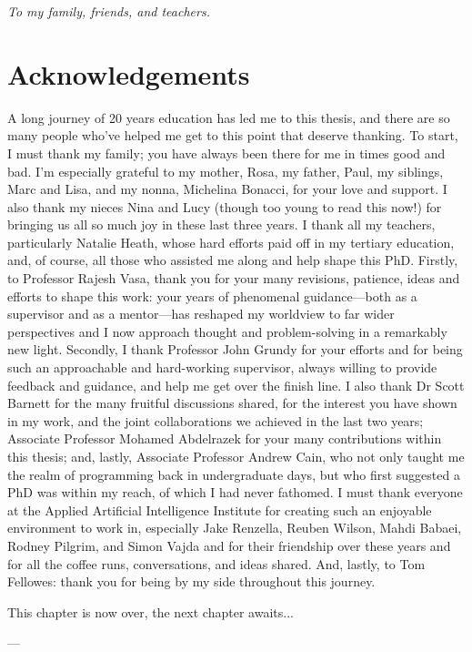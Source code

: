 \cleardoublepage
\pagestyle{empty}
\begin{center}
  \vspace*{0.3\paperheight}
  \textit{To my family, friends, and teachers.}
\end{center}
\pagestyle{fancy}

\chapter*{Acknowledgements}

\vspace{-2\bigskipamount}

A long journey of 20 years education has led me to this thesis, and there are so many people who've helped me get to this point that deserve thanking. To start, I must thank my family; you have always been there for me in times good and bad. I'm especially grateful to my mother, Rosa, my father, Paul, my siblings, Marc and Lisa, and my nonna, Michelina Bonacci, for your love and support. I also thank my nieces Nina and Lucy (though too young to read this now!) for bringing us all so much joy in these last three years. I thank all my teachers, particularly Natalie Heath, whose hard efforts paid off in my tertiary education, and, of course, all those who assisted me along and help shape this PhD. Firstly, to Professor Rajesh Vasa, thank you for your many revisions, patience, ideas and efforts to shape this work: your years of phenomenal guidance---both as a supervisor and as a mentor---has reshaped my worldview to far wider perspectives and I now approach thought and problem-solving in a remarkably new light. Secondly, I thank Professor John Grundy for your efforts and for being such an approachable and hard-working supervisor, always willing to provide feedback and guidance, and help me get over the finish line. I also thank Dr Scott Barnett for the many fruitful discussions shared, for the interest you have shown in my work, and the joint collaborations we achieved in the last two years; Associate Professor Mohamed Abdelrazek for your many contributions within this thesis; and, lastly, Associate Professor Andrew Cain, who not only taught me the realm of programming back in undergraduate days, but who first suggested a PhD was within my reach, of which I had never fathomed. I must thank everyone at the Applied Artificial Intelligence Institute for creating such an enjoyable environment to work in, especially Jake Renzella,  Reuben Wilson, Mahdi Babaei, Rodney Pilgrim, and Simon Vajda and for their friendship over these years and for all the coffee runs, conversations, and ideas shared. And, lastly, to Tom Fellowes: thank you for being by my side throughout this journey. 

\bigskip
\noindent
This chapter is now over, the next chapter awaits...

\bigskip
\noindent
\hspace{\fill}
\parbox[b]{0.4\linewidth}{
\raggedleft
\small
--- \theauthor{}\\
\thedate{}
}